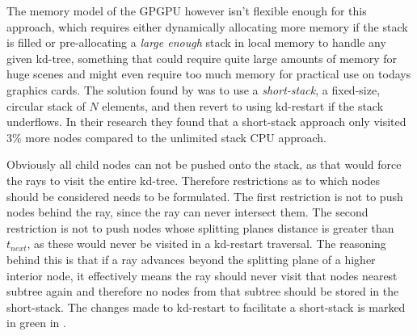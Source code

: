 The memory model of the GPGPU however isn't flexible enough for this
approach, which requires either dynamically allocating more memory if
the stack is filled or pre-allocating a \textit{large enough} stack in
local memory to handle any given kd-tree, something that could require
quite large amounts of memory for huge scenes and might even require
too much memory for practical use on todays graphics cards. The
solution found by \horn{} was to use a \textit{short-stack}, a
fixed-size, circular stack of $N$ elements, and then revert to using
kd-restart if the stack underflows. In their research they found that
a short-stack approach only visited 3\% more nodes compared to the
unlimited stack CPU approach.


Obviously all child nodes can not be pushed onto the stack, as that
would force the rays to visit the entire kd-tree. Therefore
restrictions as to which nodes should be considered needs to be
formulated. The first restriction is not to push nodes behind the ray,
since the ray can never intersect them. The second restriction is not
to push nodes whose splitting planes distance is greater than
$t_{next}$, as these would never be visited in a kd-restart
traversal. The reasoning behind this is that if a ray advances beyond
the splitting plane of a higher interior node, it effectively means
the ray should never visit that nodes nearest subtree again and
therefore no nodes from that subtree should be stored in the
short-stack. The changes made to kd-restart to facilitate a
short-stack is marked in green in .

